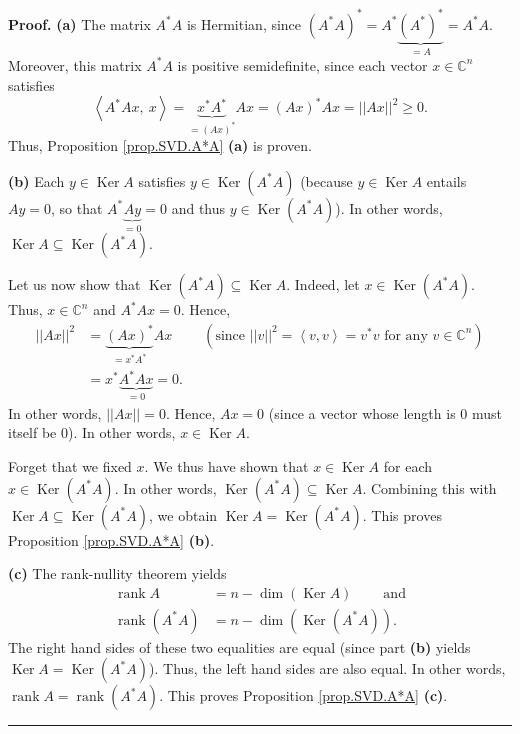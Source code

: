 \documentclass[numbers=enddot,12pt,final,onecolumn,notitlepage]{scrartcl}%
\numberwithin{exer}{subsection}
\theoremstyle{definition}
\newenvironment{proof}[1][Proof]{\noindent\textbf{#1.} }{\ \rule{0.5em}{0.5em}}
\begin{document}
\begin{proof}
\textbf{(a)} The matrix $A^{\ast}A$ is Hermitian, since $\left(  A^{\ast
}A\right)  ^{\ast}=A^{\ast}\underbrace{\left(  A^{\ast}\right)  ^{\ast}}%
_{=A}=A^{\ast}A$. Moreover, this matrix $A^{\ast}A$ is positive semidefinite,
since each vector $x\in\mathbb{C}^{n}$ satisfies%
\[
\left\langle A^{\ast}Ax,\ x\right\rangle =\underbrace{x^{\ast}A^{\ast}%
}_{=\left(  Ax\right)  ^{\ast}}Ax=\left(  Ax\right)  ^{\ast}Ax=\left\vert
\left\vert Ax\right\vert \right\vert ^{2}\geq0.
\]
Thus, Proposition \ref{prop.SVD.A*A} \textbf{(a)} is proven. \medskip

\textbf{(b)} Each $y\in\operatorname*{Ker}A$ satisfies $y\in
\operatorname*{Ker}\left(  A^{\ast}A\right)  $ (because $y\in
\operatorname*{Ker}A$ entails $Ay=0$, so that $A^{\ast}\underbrace{Ay}_{=0}=0$
and thus $y\in\operatorname*{Ker}\left(  A^{\ast}A\right)  $). In other words,
$\operatorname*{Ker}A\subseteq\operatorname*{Ker}\left(  A^{\ast}A\right)  $.

Let us now show that $\operatorname*{Ker}\left(  A^{\ast}A\right)
\subseteq\operatorname*{Ker}A$. Indeed, let $x\in\operatorname*{Ker}\left(
A^{\ast}A\right)  $. Thus, $x\in\mathbb{C}^{n}$ and $A^{\ast}Ax=0$. Hence,
\begin{align*}
\left\vert \left\vert Ax\right\vert \right\vert ^{2}  &  =\underbrace{\left(
Ax\right)  ^{\ast}}_{=x^{\ast}A^{\ast}}Ax\ \ \ \ \ \ \ \ \ \ \left(
\text{since }\left\vert \left\vert v\right\vert \right\vert ^{2}=\left\langle
v,v\right\rangle =v^{\ast}v\text{ for any }v\in\mathbb{C}^{n}\right) \\
&  =x^{\ast}\underbrace{A^{\ast}Ax}_{=0}=0.
\end{align*}
In other words, $\left\vert \left\vert Ax\right\vert \right\vert =0$. Hence,
$Ax=0$ (since a vector whose length is $0$ must itself be $0$). In other
words, $x\in\operatorname*{Ker}A$.

Forget that we fixed $x$. We thus have shown that $x\in\operatorname*{Ker}A$
for each $x\in\operatorname*{Ker}\left(  A^{\ast}A\right)  $. In other words,
$\operatorname*{Ker}\left(  A^{\ast}A\right)  \subseteq\operatorname*{Ker}A$.
Combining this with $\operatorname*{Ker}A\subseteq\operatorname*{Ker}\left(
A^{\ast}A\right)  $, we obtain $\operatorname*{Ker}A=\operatorname*{Ker}%
\left(  A^{\ast}A\right)  $. This proves Proposition \ref{prop.SVD.A*A}
\textbf{(b)}. \medskip

\textbf{(c)} The rank-nullity theorem yields%
\begin{align*}
\operatorname*{rank}A  &  =n-\dim\left(  \operatorname*{Ker}A\right)
\ \ \ \ \ \ \ \ \ \ \text{and}\\
\operatorname*{rank}\left(  A^{\ast}A\right)   &  =n-\dim\left(
\operatorname*{Ker}\left(  A^{\ast}A\right)  \right)  .
\end{align*}
The right hand sides of these two equalities are equal (since part
\textbf{(b)} yields $\operatorname*{Ker}A=\operatorname*{Ker}\left(  A^{\ast
}A\right)  $). Thus, the left hand sides are also equal. In other words,
$\operatorname*{rank}A=\operatorname*{rank}\left(  A^{\ast}A\right)  $. This
proves Proposition \ref{prop.SVD.A*A} \textbf{(c)}.
\end{proof}
\end{document}
